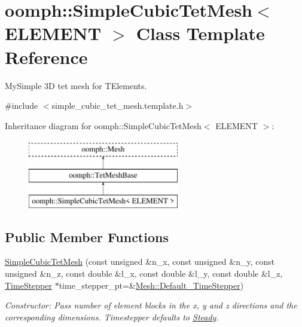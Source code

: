 \hypertarget{classoomph_1_1SimpleCubicTetMesh}{}\section{oomph\+:\+:Simple\+Cubic\+Tet\+Mesh$<$ E\+L\+E\+M\+E\+NT $>$ Class Template Reference}
\label{classoomph_1_1SimpleCubicTetMesh}


My\+Simple 3D tet mesh for T\+Elements.  




{\ttfamily \#include $<$simple\+\_\+cubic\+\_\+tet\+\_\+mesh.\+template.\+h$>$}

Inheritance diagram for oomph\+:\+:Simple\+Cubic\+Tet\+Mesh$<$ E\+L\+E\+M\+E\+NT $>$\+:\begin{figure}[H]
\begin{center}
\leavevmode
\includegraphics[height=3.000000cm]{classoomph_1_1SimpleCubicTetMesh}
\end{center}
\end{figure}
\subsection*{Public Member Functions}
\begin{DoxyCompactItemize}
\item 
\hyperlink{classoomph_1_1SimpleCubicTetMesh_a636c5d124ede05ff29abdcf7fdd08391}{Simple\+Cubic\+Tet\+Mesh} (const unsigned \&n\+\_\+x, const unsigned \&n\+\_\+y, const unsigned \&n\+\_\+z, const double \&l\+\_\+x, const double \&l\+\_\+y, const double \&l\+\_\+z, \hyperlink{classoomph_1_1TimeStepper}{Time\+Stepper} $\ast$time\+\_\+stepper\+\_\+pt=\&\hyperlink{classoomph_1_1Mesh_a12243d0fee2b1fcee729ee5a4777ea10}{Mesh\+::\+Default\+\_\+\+Time\+Stepper})
\begin{DoxyCompactList}\small\item\em Constructor\+: Pass number of element blocks in the x, y and z directions and the corresponding dimensions. Timestepper defaults to \hyperlink{classoomph_1_1Steady}{Steady}. \end{DoxyCompactList}\end{DoxyCompactItemize}
